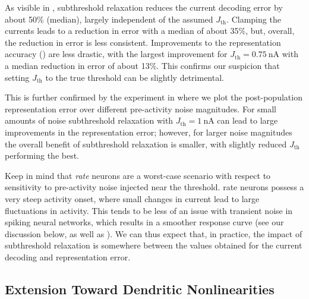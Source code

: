 As visible in , subthreshold relaxation reduces the current decoding error by about 50\% (median), largely independent of the assumed $J_\mathrm{th}$.
Clamping the currents leads to a reduction in error with a median of about 35\%, but, overall, the reduction in error is less consistent.
Improvements to the representation accuracy () are less drastic, with the largest improvement for $J_\mathrm{th} = \SI{0.75}{\nano\ampere}$ with a median reduction in error of about 13\%.
This confirms our suspicion that setting $J_\mathrm{th}$ to the true threshold can be slightly detrimental.

This is further confirmed by the experiment in  where we plot the post-population representation error over different pre-activity noise magnitudes.
For small amounts of noise subthreshold relaxation with $J_\mathrm{th} = \SI{1}{\nano\ampere}$ can lead to large improvements in the representation error; however, for larger noise magnitudes the overall benefit of subthreshold relaxation is smaller, with slightly reduced $J_\mathrm{th}$ performing the best.

Keep in mind that \LIF \emph{rate} neurons are a worst-case scenario with respect to sensitivity to pre-activity noise injected near the threshold.
\LIF rate neurons possess a very steep activity onset, where small changes in current lead to large fluctuations in activity.
This tends to be less of an issue with transient noise in spiking neural networks, which results in a smoother response curve (see our discussion below, as well as \cite{hunsberger2015spiking}).
We can thus expect that, in practice, the impact of subthreshold relaxation is somewhere between the values obtained for the current decoding and representation error.

\subsection{Extension Toward Dendritic Nonlinearities}
\label{sec:nef_nonlinear}

